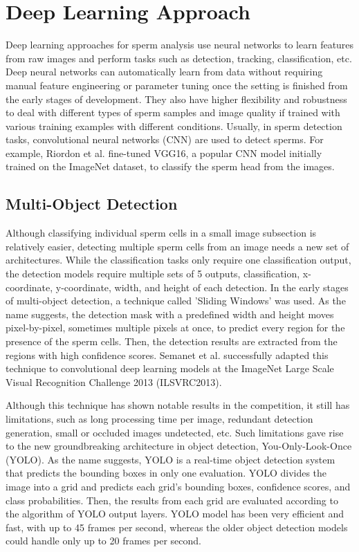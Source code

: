 \section{Deep Learning Approach}
Deep learning approaches for sperm analysis use neural networks to learn features from raw images and perform tasks such as detection, tracking, classification, etc. Deep neural networks can automatically learn from data without requiring manual feature engineering or parameter tuning once the setting is finished from the early stages of development. They also have higher flexibility and robustness to deal with different types of sperm samples and image quality if trained with various training examples with different conditions. Usually, in sperm detection tasks, convolutional neural networks (CNN) are used to detect sperms. For example, Riordon et al. fine-tuned VGG16, a popular CNN model initially trained on the ImageNet dataset, to classify the sperm head from the images. \cite{deep1} 
\subsection{Multi-Object Detection}
Although classifying individual sperm cells in a small image subsection is relatively easier, detecting multiple sperm cells from an image needs a new set of architectures. While the classification tasks only require one classification output, the detection models require multiple sets of 5 outputs, classification, x-coordinate, y-coordinate, width, and height of each detection. In the early stages of multi-object detection, a technique called 'Sliding Windows' was used. As the name suggests, the detection mask with a predefined width and height moves pixel-by-pixel, sometimes multiple pixels at once, to predict every region for the presence of the sperm cells. Then, the detection results are extracted from the regions with high confidence scores. Semanet et al. successfully adapted this technique to convolutional deep learning models at the ImageNet Large Scale Visual Recognition Challenge 2013 (ILSVRC2013). \cite{deep2} 

Although this technique has shown notable results in the competition, it still has limitations, such as long processing time per image, redundant detection generation, small or occluded images undetected, etc. Such limitations gave rise to the new groundbreaking architecture in object detection, You-Only-Look-Once (YOLO). \cite{deep3} As the name suggests, YOLO is a real-time object detection system that predicts the bounding boxes in only one evaluation. YOLO divides the image into a grid and predicts each grid's bounding boxes, confidence scores, and class probabilities. \cite{deep4} Then, the results from each grid are evaluated according to the algorithm of YOLO output layers. YOLO model has been very efficient and fast, with up to 45 frames per second, whereas the older object detection models could handle only up to 20 frames per second. \cite{deep3} 

